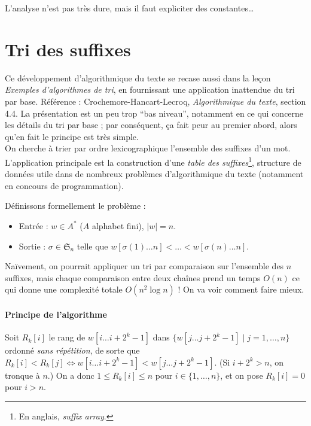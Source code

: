 \documentclass[a4paper, 11pt]{article}
\def\Sigmap{\mathfrak{S}}
\begin{document}
L'analyse n'est pas très dure, mais il faut expliciter des constantes…


\newpage

\section{Tri des suffixes}

Ce développement d'algorithmique du texte se recase aussi dans la leçon
\emph{Exemples d'algorithmes de tri}, en fournissant une application inattendue
du tri par base. Référence : Crochemore-Hancart-Lecroq, \emph{Algorithmique du
  texte}, section 4.4. La présentation est un peu trop \enquote{bas niveau},
notamment en ce qui concerne les détails du tri par base ; par conséquent, ça
fait peur au premier abord, alors qu'en fait le principe est très simple.\\

On cherche à trier par ordre lexicographique l'ensemble des suffixes d'un mot.
L'application principale est la construction d'une \emph{table des
  suffixes}\footnote{En anglais, \emph{suffix array}.}, structure de données
utile dans de nombreux problèmes d'algorithmique du texte (notamment en concours
de programmation).

Définissons formellement le problème :
\begin{itemize}
\item Entrée : $w \in A^*$ ($A$ alphabet fini), $|w| = n$.
\item Sortie : $\sigma \in \Sigmap_n$ telle que $w[\sigma(1) \ldots n] < \ldots
  < w[\sigma(n) \ldots n]$.
\end{itemize}

Naïvement, on pourrait appliquer un tri par comparaison sur l'ensemble des $n$
suffixes, mais chaque comparaison entre deux chaînes prend un temps $O(n)$ ce
qui donne une complexité totale $O(n^2 \log n)$ ! On va voir comment faire
mieux.

\paragraph{Principe de l'algorithme}

Soit $R_k[i]$ le rang de $w[i \ldots i + 2^k - 1]$ dans $\{ w[j \ldots j + 2^k -
1] \mid j = 1, \ldots, n \}$ ordonné \emph{sans répétition}, de sorte que
$R_k[i] < R_k[j] \Leftrightarrow w[i \ldots i + 2^k - 1] < w[j \ldots j + 2^k -
1]$. (Si $i + 2^k > n$, on tronque à $n$.) On a donc $1 \leq R_k[i] \leq n$ pour
$i \in \{1, \ldots, n\}$, et on pose $R_k[i] = 0$ pour $i > n$.
\end{document}
